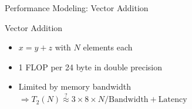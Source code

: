 \begin{frame}{Performance Modeling: Vector Addition}

 \begin{block}{Vector Addition}
  \begin{itemize}
   \item $x = y + z$ with $N$ elements each
   \item 1 FLOP per 24 byte in double precision
   \item Limited by memory bandwidth $\Rightarrow T_2(N) \stackrel{?}{\approx} 3 \times 8 \times N / \mathrm{Bandwidth} + \mathrm{Latency}$
  \end{itemize}
 \end{block}

 \vspace*{-0.5cm}
 \begin{center}
  
 \end{center}
 
 \end{frame}

